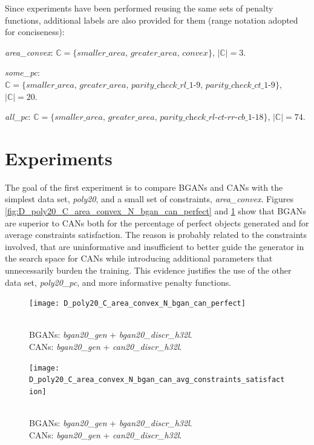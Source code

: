 Since experiments have been performed reusing the same sets of penalty functions, additional labels are also provided for them (range notation adopted for conciseness):

\begin{description}
\item \textit{area\_convex}: $\mathbb{C} = \{\textit{smaller\_area, greater\_area, convex}\}$, $|\mathbb{C}| = 3$.

\item \textit{some\_pc}: $\mathbb{C} = \{\textit{smaller\_area, greater\_area, parity\_check\_rl\_1-9, parity\_check\_ct\_1-9}\}$, $|\mathbb{C}| = 20$.

\item \textit{all\_pc}: $\mathbb{C} = \{\textit{smaller\_area, greater\_area, parity\_check\_rl-ct-rr-cb\_1-18}\}$, $|\mathbb{C}| = 74$.
\end{description}



\section{Experiments}

The goal of the first experiment is to compare BGANs and CANs with the simplest data set, \textit{poly20}, and a small set of constraints, \textit{area\_convex}. 
Figures \ref{fig:D_poly20_C_area_convex_N_bgan_can_perfect} and \ref{fig:D_poly20_C_area_convex_N_bgan_can_avg_constraints_satisfaction} show that BGANs are superior to CANs both for the percentage of perfect objects generated and for average constraints satisfaction. The reason is probably related to the constraints involved, that are uninformative and insufficient to better guide the generator in the search space for CANs while introducing additional parameters that unnecessarily burden the training. This evidence justifies the use of the other data set, \textit{poly20\_pc}, and more informative penalty functions.

\begin{figure}[ht]
    \centering
    \begin{minipage}[t]{0.45\textwidth}
        \centering
        \texttt{[image: D\_poly20\_C\_area\_convex\_N\_bgan\_can\_perfect]}
        \caption{\\BGANs: \textit{bgan20\_gen} + \textit{bgan20\_discr\_h32l}.\\
        CANs: \textit{bgan20\_gen} + \textit{can20\_discr\_h32l}.}
        \label{fig:D_poly20_C_area_convex_N_bgan_can_perfect}
    \end{minipage}
    \hfill
    \begin{minipage}[t]{0.45\textwidth}
        \centering
        \texttt{[image: D\_poly20\_C\_area\_convex\_N\_bgan\_can\_avg\_constraints\_satisfaction]}
        \caption{\\BGANs: \textit{bgan20\_gen} + \textit{bgan20\_discr\_h32l}.\\
        CANs: \textit{bgan20\_gen} + \textit{can20\_discr\_h32l}.}
        \label{fig:D_poly20_C_area_convex_N_bgan_can_avg_constraints_satisfaction}
    \end{minipage}
\end{figure}


